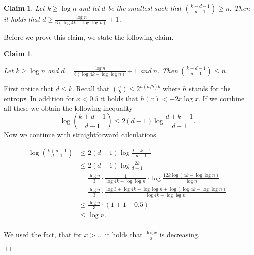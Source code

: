 \documentclass[11pt,a4paper]{article}
\date{\today}
\newtheorem{claim}[theorem]{Claim}
\newcommand{\qed}{$\Box$}
\newenvironment{proof}{\noindent {\bf Proof:}}{\hfill \qed \smallskip}
\begin{document}
\def\1{\mathbb{1}}
\def\R{\mathbb{R}}
\def\<{\left<}
\def\>{\right>}
\newcommand{\RL}{\mbox{{\sf RL}}}
\newcommand{\BPL}{\mbox{{\sf BPL}}}
\newcommand{\Log}{\mbox{{\sf L}}}
\newcommand{\NCo}{\mbox{{\sf NC$^1$}}}
\newcommand{\RNC}{\mbox{{\sf RNC$^1$}}}
\newcommand{\SC}{\mbox{{\sf SC}}}


\def\D{\tilde{D}}
\def\hD{\hat{D}}
\def\hR{\hat{R}}

\def\supp{{\rm{supp}}}
\def\rank{{\rm{rank}}}
 \newcommand{\todo}[1]{\marginpar{#1}}
 
\def\prl{\|} \begin{claim} \label{cl:lower_bound_d} Let $k\ge \log n$ and let $d$ be the smallest such that 
${k+d-1 \choose d-1}\ge n$. Then it holds that $d\ge \frac{\log n}{6 (\log 4k - \log \log n)} + 1$. 
\end{claim}

Before we prove this claim, we state the following claim.
\begin{claim}
\label{cl:d_value}

Let $k\ge \log n$ and $d = \frac{\log n}{6 (\log 4k - \log \log n)} + 1$ and $n$. Then ${k+d-1 \choose d-1} 
\leq n$.

\end{claim}

\todo{omezit n}
\begin{proof}

First notice that $d\leq k$. Recall that ${a \choose b}\leq 2^{h(a/b)b}$ where $h$ stands for the entropy. 
In addition for $x<0.5$ it holds that $h(x)<- 2x \log x$. If we combine all these we obtain the following 
inequality $$\log {k + d - 1 \choose d - 1} \leq 2(d - 1) \log\frac{d + k - 1}{d - 1}.$$ Now we continue 
with straightforward calculations.

\[
\begin{split}
\log {k + d - 1 \choose d - 1}
	& \leq 2(d - 1) \log\frac{d + k - 1}{d - 1} \\
	& \leq 2(d - 1) \log\frac{2k}{d - 1} \\
	& = \frac{\log n}{3} \cdot \frac{1}{\log 4k - \log \log n} \cdot \log \frac{12k \log (4k - \log \log n)}{\log n} \\
	& = \frac{\log n}{3} \cdot \frac{\log 3 + \log 4k - \log \log n + \log (\log 4k - \log \log n)}{\log 4k - \log \log n} \\
	& \leq \frac{\log n}{3} \cdot (1 + 1 + 0.5) \\
	& \leq \log n.\\
\end{split}
\]
    
We used the fact, that for $x>...$ it holds that $\frac{\log x}{x}$ is decreasing.     
                
\end{proof}
\end{document}
